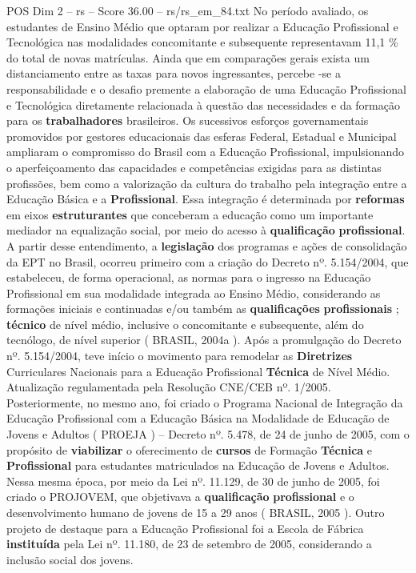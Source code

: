\begin{textsample}{POS Dim 2 – rs – Score 36.00 – rs/rs\_em\_84.txt}
No período avaliado, os estudantes de Ensino Médio que optaram por realizar a Educação Profissional e Tecnológica nas modalidades concomitante e subsequente representavam 11,1 \% do total de novas matrículas.
Ainda que em comparações gerais exista um distanciamento entre as taxas para novos ingressantes, percebe -se a responsabilidade e o desafio premente a elaboração de uma Educação Profissional e Tecnológica diretamente relacionada à questão das necessidades e da formação para os \textbf{trabalhadores} brasileiros.
Os sucessivos esforços governamentais promovidos por gestores educacionais das esferas Federal, Estadual e Municipal ampliaram o compromisso do Brasil com a Educação Profissional, impulsionando o aperfeiçoamento das capacidades e competências exigidas para as distintas profissões, bem como a valorização da cultura do trabalho pela integração entre a Educação Básica e a \textbf{Profissional}.
Essa integração é determinada por \textbf{reformas} em eixos \textbf{estruturantes} que conceberam a educação como um importante mediador na equalização social, por meio do acesso à \textbf{qualificação} \textbf{profissional}.
A partir desse entendimento, a \textbf{legislação} dos programas e ações de consolidação da EPT no Brasil, ocorreu primeiro com a criação do Decreto nº. 5.154/2004, que estabeleceu, de forma operacional, as normas para o ingresso na Educação Profissional em sua modalidade integrada ao Ensino Médio, considerando as formações iniciais e continuadas e/ou também as \textbf{qualificações} \textbf{profissionais} ; \textbf{técnico} de nível médio, inclusive o concomitante e subsequente, além do tecnólogo, de nível superior ( BRASIL, 2004a ).
Após a promulgação do Decreto nº. 5.154/2004, teve início o movimento para remodelar as \textbf{Diretrizes} Curriculares Nacionais para a Educação Profissional \textbf{Técnica} de Nível Médio.
Atualização regulamentada pela Resolução CNE/CEB nº. 1/2005.
Posteriormente, no mesmo ano, foi criado o Programa Nacional de Integração da Educação Profissional com a Educação Básica na Modalidade de Educação de Jovens e Adultos ( PROEJA ) – Decreto nº. 5.478, de 24 de junho de 2005, com o propósito de \textbf{viabilizar} o oferecimento de \textbf{cursos} de Formação \textbf{Técnica} e \textbf{Profissional} para estudantes matriculados na Educação de Jovens e Adultos.
Nessa mesma época, por meio da Lei nº. 11.129, de 30 de junho de 2005, foi criado o PROJOVEM, que objetivava a \textbf{qualificação} \textbf{profissional} e o desenvolvimento humano de jovens de 15 a 29 anos ( BRASIL, 2005 ).
Outro projeto de destaque para a Educação Profissional foi a Escola de Fábrica \textbf{instituída} pela Lei nº. 11.180, de 23 de setembro de 2005, considerando a inclusão social dos jovens.

\end{textsample}
